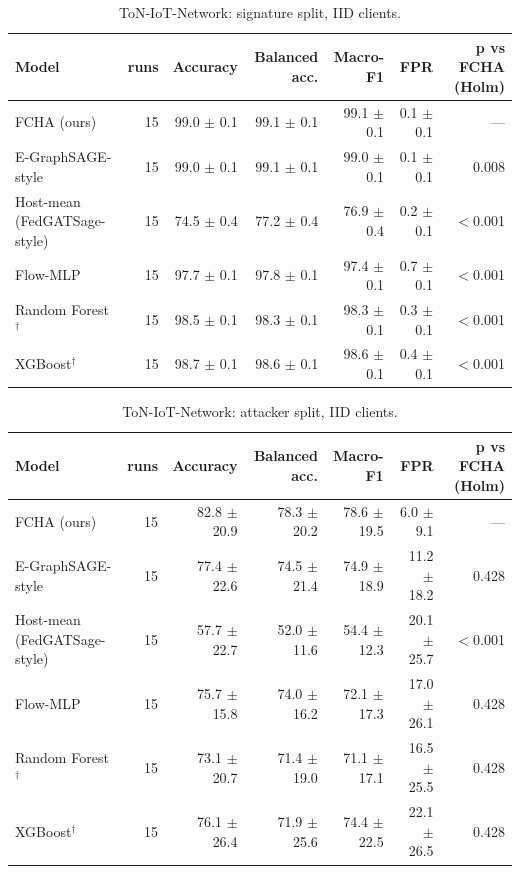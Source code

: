 \begin{table}[t]
\centering
\caption{ToN-IoT-Network: signature split, IID clients.}
\label{tab:ton_iot_network_signature}
\begin{tabular}{lrrrrrr}
\toprule
Model & runs & Accuracy & Balanced acc. & Macro-F1 & FPR & p vs FCHA (Holm) \\
\midrule
FCHA (ours) & 15 & 99.0 $\pm$ 0.1 & 99.1 $\pm$ 0.1 & 99.1 $\pm$ 0.1 & 0.1 $\pm$ 0.1 & — \\
E-GraphSAGE-style & 15 & 99.0 $\pm$ 0.1 & 99.1 $\pm$ 0.1 & 99.0 $\pm$ 0.1 & 0.1 $\pm$ 0.1 & 0.008 \\
Host-mean (FedGATSage-style) & 15 & 74.5 $\pm$ 0.4 & 77.2 $\pm$ 0.4 & 76.9 $\pm$ 0.4 & 0.2 $\pm$ 0.1 & $<$0.001 \\
Flow-MLP & 15 & 97.7 $\pm$ 0.1 & 97.8 $\pm$ 0.1 & 97.4 $\pm$ 0.1 & 0.7 $\pm$ 0.1 & $<$0.001 \\
Random Forest$^\dagger$ & 15 & 98.5 $\pm$ 0.1 & 98.3 $\pm$ 0.1 & 98.3 $\pm$ 0.1 & 0.3 $\pm$ 0.1 & $<$0.001 \\
XGBoost$^\dagger$ & 15 & 98.7 $\pm$ 0.1 & 98.6 $\pm$ 0.1 & 98.6 $\pm$ 0.1 & 0.4 $\pm$ 0.1 & $<$0.001 \\
\bottomrule
\end{tabular}
\end{table}

\begin{table}[t]
\centering
\caption{ToN-IoT-Network: attacker split, IID clients.}
\label{tab:ton_iot_network_attacker}
\begin{tabular}{lrrrrrr}
\toprule
Model & runs & Accuracy & Balanced acc. & Macro-F1 & FPR & p vs FCHA (Holm) \\
\midrule
FCHA (ours) & 15 & 82.8 $\pm$ 20.9 & 78.3 $\pm$ 20.2 & 78.6 $\pm$ 19.5 & 6.0 $\pm$ 9.1 & — \\
E-GraphSAGE-style & 15 & 77.4 $\pm$ 22.6 & 74.5 $\pm$ 21.4 & 74.9 $\pm$ 18.9 & 11.2 $\pm$ 18.2 & 0.428 \\
Host-mean (FedGATSage-style) & 15 & 57.7 $\pm$ 22.7 & 52.0 $\pm$ 11.6 & 54.4 $\pm$ 12.3 & 20.1 $\pm$ 25.7 & $<$0.001 \\
Flow-MLP & 15 & 75.7 $\pm$ 15.8 & 74.0 $\pm$ 16.2 & 72.1 $\pm$ 17.3 & 17.0 $\pm$ 26.1 & 0.428 \\
Random Forest$^\dagger$ & 15 & 73.1 $\pm$ 20.7 & 71.4 $\pm$ 19.0 & 71.1 $\pm$ 17.1 & 16.5 $\pm$ 25.5 & 0.428 \\
XGBoost$^\dagger$ & 15 & 76.1 $\pm$ 26.4 & 71.9 $\pm$ 25.6 & 74.4 $\pm$ 22.5 & 22.1 $\pm$ 26.5 & 0.428 \\
\bottomrule
\end{tabular}
\end{table}

